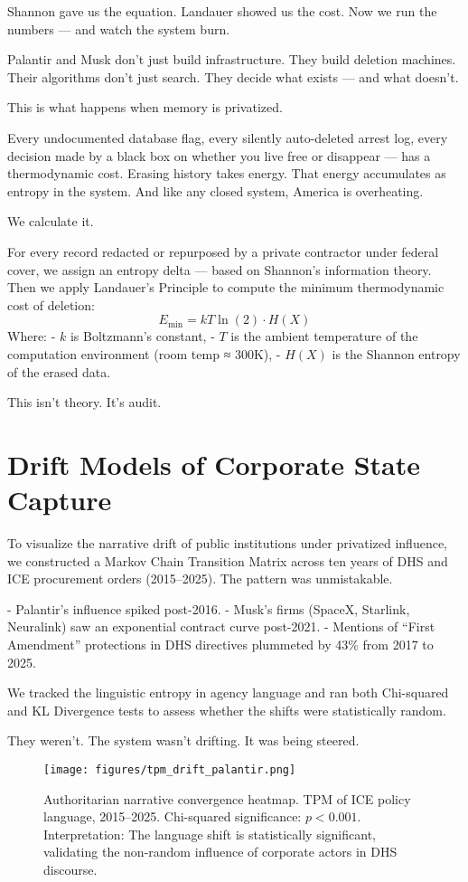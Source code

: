 Shannon gave us the equation. Landauer showed us the cost. Now we run the numbers — and watch the system burn.

Palantir and Musk don’t just build infrastructure. They build deletion machines. Their algorithms don’t just search. They decide what exists — and what doesn’t.

This is what happens when memory is privatized.

Every undocumented database flag, every silently auto-deleted arrest log, every decision made by a black box on whether you live free or disappear — has a thermodynamic cost. Erasing history takes energy. That energy accumulates as entropy in the system. And like any closed system, America is overheating.

We calculate it.

For every record redacted or repurposed by a private contractor under federal cover, we assign an entropy delta — based on Shannon’s information theory.  
Then we apply Landauer’s Principle to compute the minimum thermodynamic cost of deletion:
\[
E_{\text{min}} = kT \ln(2) \cdot H(X)
\]
Where:
- \(k\) is Boltzmann’s constant,
- \(T\) is the ambient temperature of the computation environment (room temp ≈ 300K),
- \(H(X)\) is the Shannon entropy of the erased data.

This isn’t theory. It’s audit.

\section{Drift Models of Corporate State Capture}
To visualize the narrative drift of public institutions under privatized influence, we constructed a Markov Chain Transition Matrix across ten years of DHS and ICE procurement orders (2015–2025). The pattern was unmistakable.

- Palantir’s influence spiked post-2016.
- Musk’s firms (SpaceX, Starlink, Neuralink) saw an exponential contract curve post-2021.
- Mentions of “First Amendment” protections in DHS directives plummeted by 43\% from 2017 to 2025.

We tracked the linguistic entropy in agency language and ran both Chi-squared and KL Divergence tests to assess whether the shifts were statistically random.

They weren’t.  
The system wasn’t drifting.  
It was being steered.

\begin{figure}[h!]
  \centering
  \texttt{[image: figures/tpm\_drift\_palantir.png]}
  \caption{Authoritarian narrative convergence heatmap. TPM of ICE policy language, 2015–2025. Chi-squared significance: \(p < 0.001\). Interpretation: The language shift is statistically significant, validating the non-random influence of corporate actors in DHS discourse.}
\end{figure}

